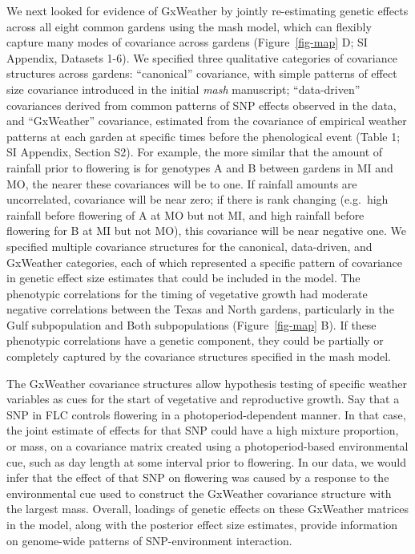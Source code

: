 \documentclass[
  9pt,
  twocolumn,
  twoside]{pnas-new}
\begin{document}
We next looked for evidence of GxWeather by jointly re-estimating
genetic effects across all eight common gardens using the mash model,
which can flexibly capture many modes of covariance across gardens
(Figure~\ref{fig-map} D; SI Appendix, Datasets 1-6). We specified three
qualitative categories of covariance structures across gardens:
``canonical'' covariance, with simple patterns of effect size covariance
introduced in the initial \emph{mash} manuscript; ``data-driven''
covariances derived from common patterns of SNP effects observed in the
data, and ``GxWeather'' covariance, estimated from the covariance of
empirical weather patterns at each garden at specific times before the
phenological event (Table 1; SI Appendix, Section S2). For example, the
more similar that the amount of rainfall prior to flowering is for
genotypes A and B between gardens in MI and MO, the nearer these
covariances will be to one. If rainfall amounts are uncorrelated,
covariance will be near zero; if there is rank changing (e.g.~high
rainfall before flowering of A at MO but not MI, and high rainfall
before flowering for B at MI but not MO), this covariance will be near
negative one. We specified multiple covariance structures for the
canonical, data-driven, and GxWeather categories, each of which
represented a specific pattern of covariance in genetic effect size
estimates that could be included in the model. The phenotypic
correlations for the timing of vegetative growth had moderate negative
correlations between the Texas and North gardens, particularly in the
Gulf subpopulation and Both subpopulations (Figure~\ref{fig-map} B). If
these phenotypic correlations have a genetic component, they could be
partially or completely captured by the covariance structures specified
in the mash model.

The GxWeather covariance structures allow hypothesis testing of specific
weather variables as cues for the start of vegetative and reproductive
growth. Say that a SNP in FLC controls flowering in a
photoperiod-dependent manner. In that case, the joint estimate of
effects for that SNP could have a high mixture proportion, or mass, on a
covariance matrix created using a photoperiod-based environmental cue,
such as day length at some interval prior to flowering. In our data, we
would infer that the effect of that SNP on flowering was caused by a
response to the environmental cue used to construct the GxWeather
covariance structure with the largest mass. Overall, loadings of genetic
effects on these GxWeather matrices in the model, along with the
posterior effect size estimates, provide information on genome-wide
patterns of SNP-environment interaction.
\end{document}
